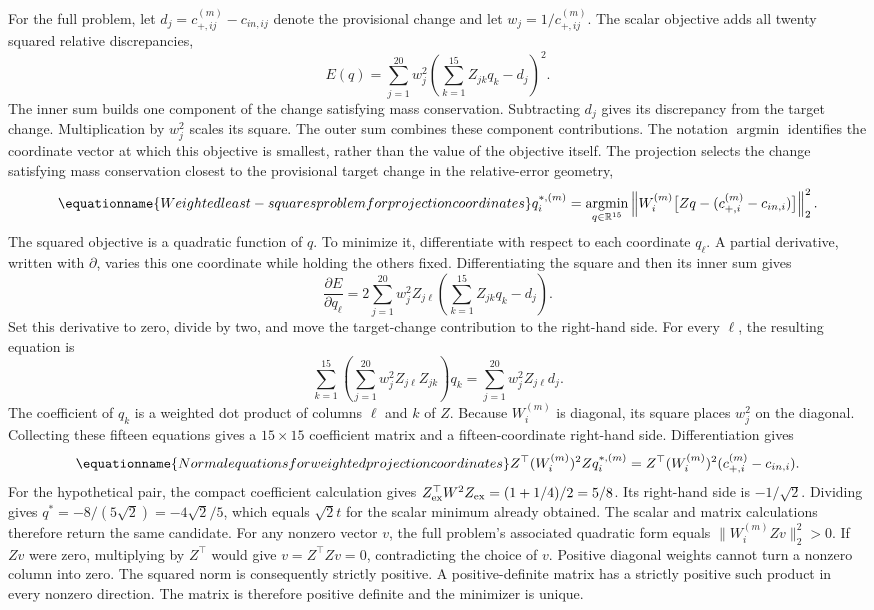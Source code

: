For the full problem, let $d_j=c_{+,ij}^{(m)}-c_{in,ij}$ denote the provisional change and let $w_j=1/c_{+,ij}^{(m)}$. The scalar objective adds all twenty squared relative discrepancies,
\[
E(q)=\sum_{j=1}^{20}
w_j^2\left(\sum_{k=1}^{15}Z_{jk}q_k-d_j\right)^2.
\]
The inner sum builds one component of the change satisfying mass conservation. Subtracting $d_j$ gives its discrepancy from the target change. Multiplication by $w_j^2$ scales its square. The outer sum combines these component contributions. The notation $\operatorname{argmin}$ identifies the coordinate vector at which this objective is smallest, rather than the value of the objective itself. The projection selects the change satisfying mass conservation closest to the provisional target change in the relative-error geometry,
\begin{equation}
\equationname{Weighted least-squares problem for projection coordinates}
q_i^{*,(m)}=\underset{q\in\mathbb{R}^{15}}{\operatorname{argmin}}
\left\|W_i^{(m)}\bigl[Zq-(c_{+,i}^{(m)}-c_{in,i})\bigr]\right\|_2^2.
\label{eq:projection_weighted_least_squares}
\end{equation}
The squared objective is a quadratic function of $q$. To minimize it, differentiate with respect to each coordinate $q_\ell$. A partial derivative, written with $\partial$, varies this one coordinate while holding the others fixed. Differentiating the square and then its inner sum gives
\[
\frac{\partial E}{\partial q_\ell}
=2\sum_{j=1}^{20}w_j^2 Z_{j\ell}
\left(\sum_{k=1}^{15}Z_{jk}q_k-d_j\right).
\]
Set this derivative to zero, divide by two, and move the target-change contribution to the right-hand side. For every $\ell$, the resulting equation is
\[
\sum_{k=1}^{15}\left(\sum_{j=1}^{20}w_j^2Z_{j\ell}Z_{jk}\right)q_k
=\sum_{j=1}^{20}w_j^2Z_{j\ell}d_j.
\]
The coefficient of $q_k$ is a weighted dot product of columns $\ell$ and $k$ of $Z$. Because $W_i^{(m)}$ is diagonal, its square places $w_j^2$ on the diagonal. Collecting these fifteen equations gives a $15\times15$ coefficient matrix and a fifteen-coordinate right-hand side. Differentiation gives
\begin{equation}
\equationname{Normal equations for weighted projection coordinates}
Z^\top(W_i^{(m)})^2Zq_i^{*,(m)}
=Z^\top(W_i^{(m)})^2(c_{+,i}^{(m)}-c_{in,i}).
\label{eq:projection_normal_conditions}
\end{equation}
For the hypothetical pair, the compact coefficient calculation gives $Z_{\rm ex}^\top W^2Z_{\rm ex}=(1+1/4)/2=5/8$. Its right-hand side is $-1/\sqrt2$. Dividing gives $q^*=-8/(5\sqrt2)=-4\sqrt2/5$, which equals $\sqrt2t$ for the scalar minimum already obtained. The scalar and matrix calculations therefore return the same candidate. For any nonzero vector $v$, the full problem's associated quadratic form equals $\|W_i^{(m)}Zv\|_2^2>0$. If $Zv$ were zero, multiplying by $Z^\top$ would give $v=Z^\top Zv=0$, contradicting the choice of $v$. Positive diagonal weights cannot turn a nonzero column into zero. The squared norm is consequently strictly positive. A positive-definite matrix has a strictly positive such product in every nonzero direction. The matrix is therefore positive definite and the minimizer is unique.

